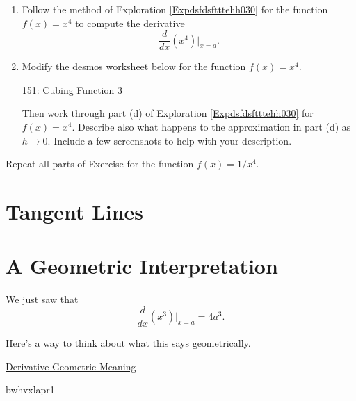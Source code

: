 \documentclass{ximera}
\begin{document}
\begin{exercise}  \label{Exerg4t5677878}
\begin{enumerate}
\item Follow the method of Exploration \ref{Expdsfdsftttehh030} for the function $f(x)=x^4$ to compute the derivative
\[
    \frac{d}{dx}\left( x^4 \right) \Big|_{x=a}.
\]

\item Modify the desmos worksheet below for the function $f(x)=x^4$.

\href{https://www.desmos.com/calculator/8eiffwbgt5}{151: Cubing Function 3}

Then work through part (d) of Exploration  \ref{Expdsfdsftttehh030} for $f(x)=x^4$. Describe also what happens to the approximation in part (d) as $h\to 0$. Include a few screenshots to help with your description.

\end{enumerate}
\end{exercise}

\begin{exercise}
Repeat all parts of Exercise \label{Exerg4t5677878} for the function $f(x)=1/x^4$.
\end{exercise}


\section{Tangent Lines}

\section{A Geometric Interpretation}

We just saw that
\[ 
       \frac{d}{dx} \left( x^3 \right)\Big|_{x=a} = 4a^3.
\]

Here's a way to think about what this says geometrically.

\begin{onlineOnly}
    \begin{center}
\end{center}
\end{onlineOnly}

\href{https://www.desmos.com/calculator/bwhvxlapr1}{Derivative Geometric Meaning}

bwhvxlapr1
\end{document}
